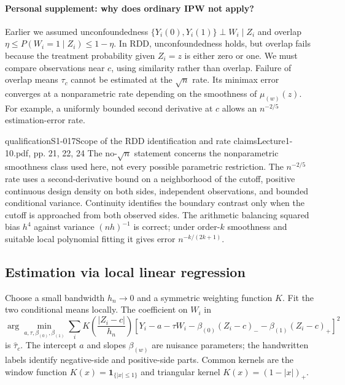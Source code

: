 \paragraph{Personal supplement: why does ordinary IPW not apply?}
Earlier we assumed unconfoundedness $\{Y_i(0),Y_i(1)\}\perp W_i\mid Z_i$ and overlap
$\eta\leq P(W_i=1\mid Z_i)\leq1-\eta$. In RDD, unconfoundedness holds, but overlap fails because the treatment probability given $Z_i=z$ is either zero or one.  We must compare observations near $c$, using similarity rather than overlap.
Failure of overlap means $\tau_c$ cannot be estimated at the $\sqrt n$ rate. Its minimax error converges at a nonparametric rate depending on the smoothness of $\mu_{(w)}(z)$. For example, a uniformly bounded second derivative at $c$ allows an $n^{-2/5}$ estimation-error rate.
\begin{reviewnote}{qualification}{S1-017}{Scope of the RDD identification and rate claims}{Lecture1-10.pdf, pp. 21, 22, 24}
The no-$\sqrt n$ statement concerns the nonparametric smoothness class used here, not every possible parametric restriction. The $n^{-2/5}$ rate uses a second-derivative bound on a neighborhood of the cutoff, positive continuous design density on both sides, independent observations, and bounded conditional variance. Continuity identifies the boundary contrast only when the cutoff is approached from both observed sides. The arithmetic balancing squared bias $h^4$ against variance $(nh)^{-1}$ is correct; under order-$k$ smoothness and suitable local polynomial fitting it gives error $n^{-k/(2k+1)}$.
\end{reviewnote}

\subsection{Estimation via local linear regression}
Choose a small bandwidth $h_n\to0$ and a symmetric weighting function $K$. Fit the two conditional means locally. The coefficient on $W_i$ in
\[
\arg\min_{a,\tau,\beta_{(0)},\beta_{(1)}}\sum_i
K\left(\frac{|Z_i-c|}{h_n}\right)
[Y_i-a-\tau W_i-\beta_{(0)}(Z_i-c)_--\beta_{(1)}(Z_i-c)_+]^2
\]
is $\widehat\tau_c$.
 The intercept $a$ and slopes $\beta_{(w)}$ are nuisance parameters; the handwritten labels identify negative-side and positive-side parts. Common kernels are the window function $K(x)=\mathbf1_{\{|x|\leq1\}}$ and triangular kernel $K(x)=(1-|x|)_+$.
